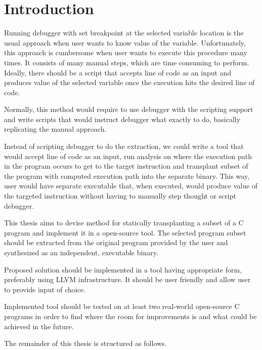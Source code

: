 \documentclass[12pt, twoside]{fithesis2}
\renewcommand{\_}{\leavevmode \kern0.07em\vbox{\hrule width0.4em}}
\begin{document}
\MainMatter
\tableofcontents



\chapter{Introduction}
\label{chap:intro}

Running debugger with set breakpoint at the selected variable location is the
usual approach when user wants to know value of the variable.
Unfortunately, this approach is cumbersome when user wants to execute this
procedure many times.
It consists of many manual steps, which are time consuming to perform.
Ideally, there should be a script that accepts line of code as an input and
produces value of the selected variable once the execution hits the desired
line of code.

Normally, this method would require to use debugger with the scripting support
and write scripts that would instruct debugger what exactly to do, basically
replicating the manual approach.

Instead of scripting debugger to do the extraction, we could write a tool that
would accept line of code as an input, run analysis on where the execution
path in the program occurs to get to the target instruction and transplant
subset of the program with computed execution path into the separate binary.
This way, user would have separate executable that, when executed, would produce
value of the targeted instruction without having to manually step thought or
script debugger.

This thesis aims to devise method for statically transplanting a subset of a C
program and implement it in a open-source tool.
The selected program subset should be extracted from the
original program provided by the user and synthesized as an independent,
executable binary.

Proposed solution should be implemented in a tool having appropriate form,
preferably using LLVM infrastructure. It should be user friendly and allow user
to provide input of choice.

Implemented tool should be tested on at least two real-world open-source C
programs in order to find where the room for improvements is and what could be
achieved in the future.


The remainder of this thesis is structured as follows.
\end{document}
